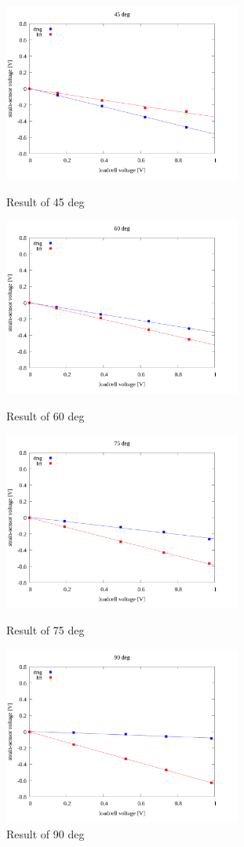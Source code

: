 \documentclass[twocolumn,a4j]{jsarticle}
\begin{document}
\begin{figure}[htbp]
    \footnotesize
    \begin{center}
        \includegraphics[width=78mm]{../images/linear/45_linear.png}
        \caption{Result of 45 deg}
        \includegraphics[width=78mm]{../images/linear/60_linear.png}
        \caption{Result of 60 deg}
        \includegraphics[width=78mm]{../images/linear/75_linear.png}
        \caption{Result of 75 deg}
        \includegraphics[width=78mm]{../images/linear/90_linear.png}
        \caption{Result of 90 deg}
    \end{center}
\end{figure}
\end{document}
